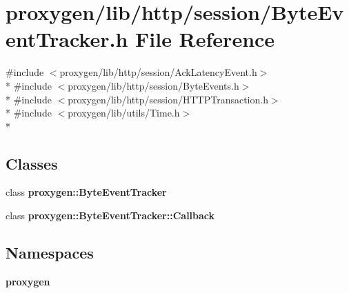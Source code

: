 \section{proxygen/lib/http/session/\+Byte\+Event\+Tracker.h File Reference}
\label{ByteEventTracker_8h}
{\ttfamily \#include $<$proxygen/lib/http/session/\+Ack\+Latency\+Event.\+h$>$}\\*
{\ttfamily \#include $<$proxygen/lib/http/session/\+Byte\+Events.\+h$>$}\\*
{\ttfamily \#include $<$proxygen/lib/http/session/\+H\+T\+T\+P\+Transaction.\+h$>$}\\*
{\ttfamily \#include $<$proxygen/lib/utils/\+Time.\+h$>$}\\*
\subsection*{Classes}
\begin{DoxyCompactItemize}
\item 
class {\bf proxygen\+::\+Byte\+Event\+Tracker}
\item 
class {\bf proxygen\+::\+Byte\+Event\+Tracker\+::\+Callback}
\end{DoxyCompactItemize}
\subsection*{Namespaces}
\begin{DoxyCompactItemize}
\item 
 {\bf proxygen}
\end{DoxyCompactItemize}
